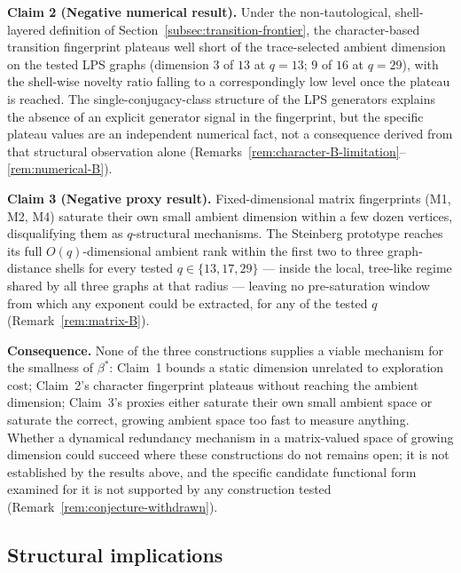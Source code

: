 \documentclass[11pt,a4paper]{article}
\theoremstyle{plain}
\theoremstyle{definition}
\theoremstyle{remark}
\newcommand{\betastar}{\beta^*}
\begin{document}
      \textbf{Claim 2 (Negative numerical result).}
      Under the non-tautological, shell-layered definition of Section~\ref{subsec:transition-frontier},
      the character-based transition fingerprint plateaus well short of the trace-selected ambient
      dimension on the tested LPS graphs (dimension $3$ of $13$ at $q=13$; $9$ of $16$ at $q=29$),
      with the shell-wise novelty ratio falling to a correspondingly low level once the plateau is
      reached.
      The single-conjugacy-class structure of the LPS generators explains the absence of an
      explicit generator signal in the fingerprint, but the specific plateau values are an
      independent numerical fact, not a consequence derived from that structural observation alone
      (Remarks~\ref{rem:character-B-limitation}--\ref{rem:numerical-B}).

      \textbf{Claim 3 (Negative proxy result).}
      Fixed-dimensional matrix fingerprints (M1, M2, M4) saturate their own small ambient dimension
      within a few dozen vertices, disqualifying them as $q$-structural mechanisms.
      The Steinberg prototype reaches its full $O(q)$-dimensional ambient rank within the first two
      to three graph-distance shells for every tested $q \in \{13,17,29\}$ --- inside the local,
      tree-like regime shared by all three graphs at that radius --- leaving no pre-saturation
      window from which any exponent could be extracted, for any of the tested $q$
      (Remark~\ref{rem:matrix-B}).

      \textbf{Consequence.}
      None of the three constructions supplies a viable mechanism for the smallness of $\betastar$:
      Claim~1 bounds a static dimension unrelated to exploration cost; Claim~2's character
      fingerprint plateaus without reaching the ambient dimension; Claim~3's proxies either
      saturate their own small ambient space or saturate the correct, growing ambient space too
      fast to measure anything.
      Whether a dynamical redundancy mechanism in a matrix-valued space of growing dimension could
      succeed where these constructions do not remains open; it is not established by the results
      above, and the specific candidate functional form examined for it is not supported by any
      construction tested (Remark~\ref{rem:conjecture-withdrawn}).

    \subsection{Structural implications}
      \label{subsec:structural-implications}
\end{document}
